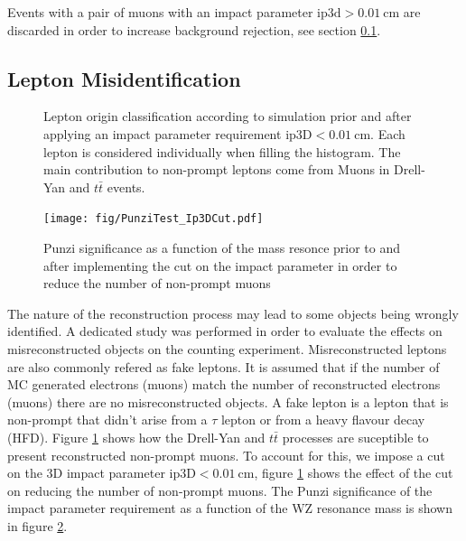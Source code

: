 Events with a pair of muons with an impact parameter $\mathrm{ip3d}>0.01~\mathrm{cm}$ are
discarded in order to increase background rejection, see section \ref{LeptonMisidentification}.

\subsection{Lepton Misidentification} \label{LeptonMisidentification}

\begin{figure}[tph]
  \centering
  \vfil
  \caption{Lepton origin classification according to simulation prior and after applying
    an impact parameter requirement $\mathrm{ip3D}<0.01~\mathrm{cm}$. Each lepton is considered individually
    when filling the histogram. The main contribution to non-prompt leptons come
    from Muons in Drell-Yan and $t\bar{t}$ events.
  }
  \label{fig:HFakeString}
\end{figure}


\begin{figure}[tph]
  \centering
  \texttt{[image: fig/PunziTest\_Ip3DCut.pdf]}
  \caption{Punzi significance as a function of the mass resonce prior to and after implementing
    the cut on the impact parameter in order to reduce the number of non-prompt
    muons}
  \label{fig:Punzi_Ip3DCut}
\end{figure}

The nature of the reconstruction process may lead to some objects being
wrongly identified. A dedicated study was performed in order to evaluate
the effects on misreconstructed objects on the counting experiment.
Misreconstructed leptons are also commonly refered as fake leptons. It
is assumed that if the number of MC generated electrons (muons) match
the number of reconstructed electrons (muons) there are no misreconstructed
objects. A fake lepton is a lepton that is non-prompt that didn't arise from
a $\tau$ lepton or from a heavy flavour decay (HFD). Figure \ref{fig:HFakeString}
shows how the Drell-Yan and $t\bar{t}$ processes are suceptible to present
reconstructed non-prompt muons. To account for this, we impose a cut on the
3D impact parameter $\mathrm{ip3D}<0.01~\mathrm{cm}$, figure \ref{fig:HFakeString}
shows the effect of the cut on reducing the number of non-prompt muons.
The Punzi significance of the impact parameter requirement as a function
of the WZ resonance mass is shown in figure \ref{fig:Punzi_Ip3DCut}. %



